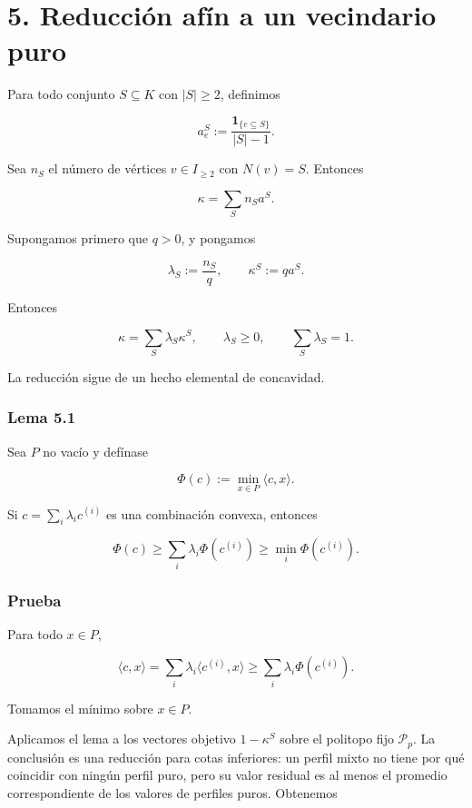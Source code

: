 \documentclass[
  11pt,
]{article}
\begin{document}
\section{5. Reducción afín a un vecindario
puro}\label{reducciuxf3n-afuxedn-a-un-vecindario-puro}

Para todo conjunto \(S\subseteq K\) con \(|S|\ge2\), definimos

\[
a_e^S
:=
\frac{\mathbf1_{\{e\subseteq S\}}}{|S|-1}.
\tag{5.1}
\]

Sea \(n_S\) el número de vértices \(v\in I_{\ge2}\) con \(N(v)=S\).
Entonces

\[
\kappa=\sum_Sn_Sa^S.
\tag{5.2}
\]

Supongamos primero que \(q>0\), y pongamos

\[
\lambda_S:=\frac{n_S}{q},
\qquad
\kappa^S:=qa^S.
\]

Entonces

\[
\kappa=\sum_S\lambda_S\kappa^S,
\qquad
\lambda_S\ge0,
\qquad
\sum_S\lambda_S=1.
\tag{5.3}
\]

La reducción sigue de un hecho elemental de concavidad.

\subsubsection{Lema 5.1}\label{lema-5.1}

Sea \(P\) no vacío y defínase

\[
\Phi(c):=\min_{x\in P}\langle c,x\rangle.
\]

Si \(c=\sum_i\lambda_ic^{(i)}\) es una combinación convexa, entonces

\[
\Phi(c)
\ge
\sum_i\lambda_i\Phi(c^{(i)})
\ge
\min_i\Phi(c^{(i)}).
\]

\subsubsection{Prueba}\label{prueba-1}

Para todo \(x\in P\),

\[
\langle c,x\rangle
=
\sum_i\lambda_i\langle c^{(i)},x\rangle
\ge
\sum_i\lambda_i\Phi(c^{(i)}).
\]

Tomamos el mínimo sobre \(x\in P\).

Aplicamos el lema a los vectores objetivo \(1-\kappa^S\) sobre el
politopo fijo \(\mathcal P_p\). La conclusión es una reducción para
cotas inferiores: un perfil mixto no tiene por qué coincidir con ningún
perfil puro, pero su valor residual es al menos el promedio
correspondiente de los valores de perfiles puros. Obtenemos
\end{document}
